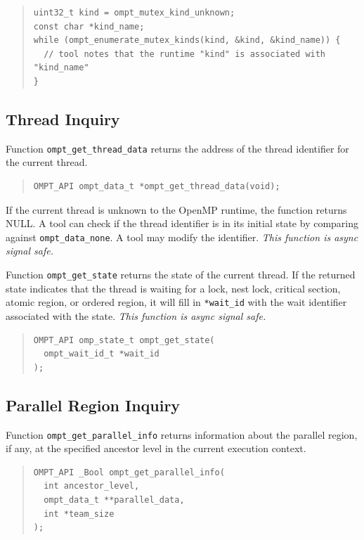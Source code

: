 \documentclass{article}
\begin{document}
\begin{quote}
\begin{verbatim}
uint32_t kind = ompt_mutex_kind_unknown;
const char *kind_name;
while (ompt_enumerate_mutex_kinds(kind, &kind, &kind_name)) {
  // tool notes that the runtime "kind" is associated with "kind_name" 
}
\end{verbatim}
\end{quote}


\subsection{Thread Inquiry}
\label{sec:thread-inquiry}

Function \verb|ompt_get_thread_data| returns the address of the thread 
identifier for the current thread.
\begin{quote}
\begin{verbatim}
OMPT_API ompt_data_t *ompt_get_thread_data(void);
\end{verbatim}
\end{quote}
If the current thread is unknown to the OpenMP runtime, the function returns NULL.
A tool can check if the thread identifier is in its initial state by comparing against \verb|ompt_data_none|.
A tool may modify the identifier.
{\em This function is async signal safe.}

Function \verb|ompt_get_state| returns the state of the 
current thread. If the returned state indicates that the thread is waiting for a lock, nest lock, critical section, atomic region, or ordered region, it will fill in \verb|*wait_id| with the wait identifier associated with the state.  {\em This function is async signal safe.}

\begin{quote}
\begin{verbatim}
OMPT_API omp_state_t ompt_get_state(
  ompt_wait_id_t *wait_id       
);
\end{verbatim}
\end{quote}
 
\subsection{Parallel Region Inquiry} 
\label{sec:parallel-inquiry} 
Function \verb|ompt_get_parallel_info| returns information about the parallel region, if any, at the specified ancestor level in the current execution context.

\begin{quote}
\begin{verbatim}
OMPT_API _Bool ompt_get_parallel_info(
  int ancestor_level,
  ompt_data_t **parallel_data,
  int *team_size
);
\end{verbatim}
\end{quote}
\end{document}
